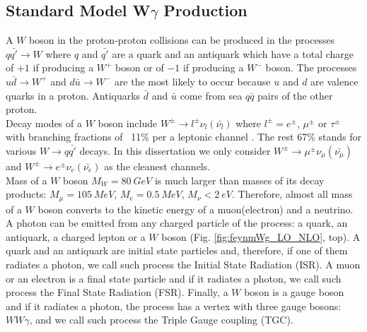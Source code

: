 \subsection{Standard Model W$\gamma$ Production}

A $W$ boson in the proton-proton collisions can be produced in the processes $q {\bar{q'}} \rightarrow W$ where $q$ and $\bar{q'}$ are a quark and an antiquark which have a total charge of $+1$ if producing a $W^+$ boson or of $-1$ if producing a $W^-$ boson. The processes $u\bar{d}\rightarrow W^+$ and $d\bar{u}\rightarrow W^-$ are the most likely to occur because $u$ and $d$ are valence quarks in a proton. Antiquarks $\bar{d}$ and $\bar{u}$ come from sea $q\bar{q}$ pairs of the other proton.\\

Decay modes of a $W$ boson include $W^\pm \rightarrow l^\pm \nu_l ({\bar{\nu_l}})$ where $l^\pm=e^\pm$, $\mu^\pm$ or $\tau^\pm$ with branching fractions of ~11\% per a leptonic channel \cite{ref_PDG}. The rest 67\% stands for various $W\rightarrow q\bar{q'}$ decays. In this dissertation we only consider $W^\pm \rightarrow \mu^\pm \nu_\mu ({\bar{\nu_\mu}})$ and $W^\pm \rightarrow e^\pm \nu_e ({\bar{\nu_e}})$ as the cleanest channels.\\

Mass of a $W$ boson $M_W=80~GeV$ is much larger than masses of its decay products: $M_\mu=105~MeV$, $M_e=0.5~MeV$, $M_\nu<2~eV$. Therefore, almost all mass of a $W$ boson converts to the kinetic energy of a muon(electron) and a neutrino.\\

A photon can be emitted from any charged particle of the process: a quark, an antiquark, a charged lepton or a $W$ boson (Fig. \ref{fig:feynmWg_LO_NLO}, top). A quark and an antiquark are initial state particles and, therefore, if one of them radiates a photon, we call such process the Initial State Radiation (ISR). A muon or an electron is a final state particle and if it radiates a photon, we call such process the Final State Radiation (FSR). Finally, a $W$ boson is a gauge boson and if it radiates a photon, the process has a vertex with three gauge bosons: $WW\gamma$, and we call such process the Triple Gauge coupling (TGC).\\

